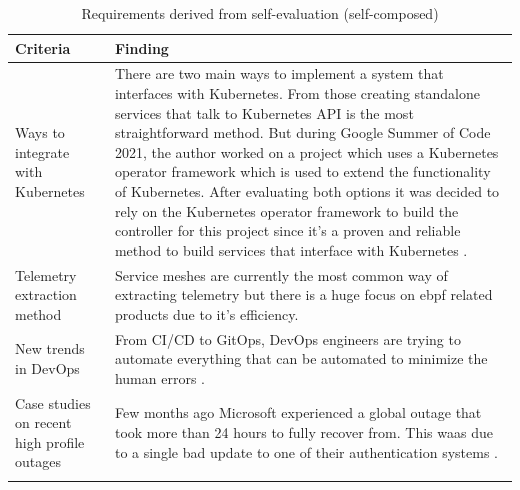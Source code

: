 \begin{longtable}{|p{50mm}|p{105mm}|}
    \hline
    \textbf{Criteria} &
    \textbf{Finding} \\ \hline

    Ways to integrate with Kubernetes &
    There are two main ways to implement a system that interfaces with Kubernetes. From those creating standalone services that talk to Kubernetes API is the most straightforward method. But during Google Summer of Code 2021, the author worked on a project which uses a Kubernetes operator framework which is used to extend the functionality of Kubernetes. After evaluating both options it was decided to rely on the Kubernetes operator framework to build the controller for this project since it's a proven and reliable method to build services that interface with Kubernetes \citep{Introduc93:online}. \\ \hline

    Telemetry extraction method &
    Service meshes are currently the most common way of extracting telemetry but there is a huge focus on \ac{ebpf} related products due to it’s efficiency. \\ \hline

    New trends in DevOps &
    From CI/CD to GitOps, DevOps engineers are trying to automate everything that can be automated to minimize the human errors \citep{CloudNat36:online}. \\ \hline

    Case studies on recent high profile outages &
    Few months ago Microsoft experienced a global outage that took more than 24 hours to fully recover from. This waas due to a single bad update to one of their authentication systems \citep{Microsof81:online}. \\ \hline
    
    \caption{Requirements derived from self-evaluation (self-composed)}
\end{longtable}


